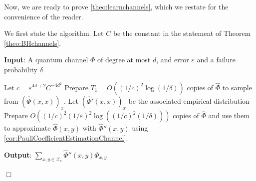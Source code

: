 \documentclass[11pt]{article}
\newcommand{\eps}{\varepsilon}
\newcommand{\BH}{\textsf{BH}}
\theoremstyle{plain}
\theoremstyle{plain}
\theoremstyle{definition}
\theoremstyle{remark}
\renewenvironment{proof}[1][]{
    \begin{trivlist}
    \item[\hspace{\labelsep}{\em\noindent Proof#1:\/}]}
    {{\hfill$\Box$}
    \end{trivlist}
}
\theoremstyle{named}
\begin{document}
\noindent Now, we are ready to prove \cref{theo:learnchannels}, which we restate for the convenience of the reader.
\learnchannels*




    \begin{proof} We first state the algorithm. Let $C$ be the constant in the statement of Theorem \ref{theo:BHchannels}.

    
    \begin{algorithm}[H]
    \caption{Learning low-degree channels via $\BH$ inequality} \label{algo:low_deg_channels}
    \textbf{Input}: A quantum channel $\Phi$ of degree at most $d$, and error $\eps$ and a failure probability $\delta$
    \begin{algorithmic}[1]
        \State Let $c=\eps^{4d+2}C^{-4d^2}$
        \State  Prepare $T_1=O((1/c)^2\log(1/\delta))$ copies of $\widehat\Phi$ to sample from $(\widehat\Phi(x,x))_x$. Let $(\widehat\Phi'(x,x))_x$ be the associated empirical distribution
            \State Prepare $O((1/c)^2(1/\eps)^{2}\log((1/c)^{2}(1/\delta)))$ copies of $\widehat\Phi$ and use them to approximate  $\widehat\Phi(x,y)$ with $\widehat\Phi''(x,y)$ using \cref{cor:PauliCoefficientEstimationChannel}. 
        
        \EndFor 
    \end{algorithmic}
    \textbf{Output}: $\sum_{x,y\in\mathcal{X}_c} \widehat\Phi''(x,y)\Phi_{x,y}$
\end{algorithm}
    

\end{proof}
\end{document}
